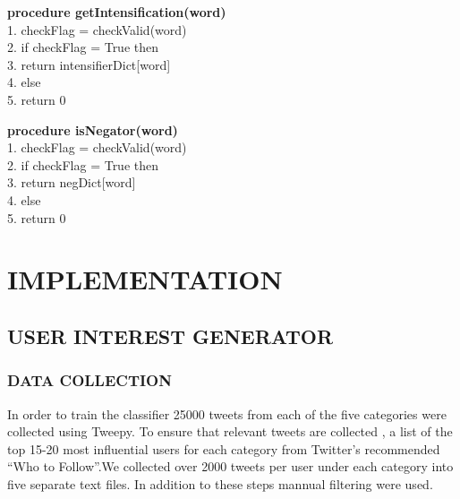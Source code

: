 \indent
\textbf{procedure getIntensification(word)} \\
1. \indent checkFlag = checkValid(word) \\
2. \indent if checkFlag = True then \\
3. \indent \indent return intensifierDict[word] \\
4. \indent else \\
5. \indent \indent return 0

\indent
\textbf{procedure isNegator(word)} \\
1. \indent checkFlag = checkValid(word) \\
2. \indent if checkFlag = True then \\
3. \indent \indent return negDict[word] \\
4. \indent else \\
5. \indent \indent return 0 \\

\chapter{IMPLEMENTATION}
\indent 
\section{USER INTEREST GENERATOR}
\subsection{DATA COLLECTION}
\par In order to train the classifier 25000 tweets from each of the five categories were collected using Tweepy. To ensure that relevant tweets are collected , a  list of the top 15-20 most influential users for each category from Twitter’s recommended “Who to Follow”.We collected over 2000 tweets per user under each category into five separate text files. In addition to these steps mannual filtering were used.
\vspace{1cm}
